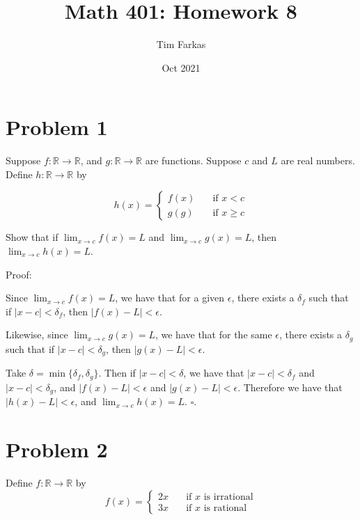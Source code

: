 \documentclass{article}
\title{Math 401: Homework 8}
\author{Tim Farkas}
\date{Oct 2021}
\begin{document}
\maketitle

\section*{Problem 1}

Suppose $f: \mathbb{R} \rightarrow \mathbb{R}$, and $g: \mathbb{R} \rightarrow \mathbb{R}$ are functions. Suppose $c$ and $L$ are real numbers. Define $h: \mathbb{R} \rightarrow \mathbb{R}$ by 

\begin{equation*}
        h(x) = \left\{
                \begin{array}{ll}
                        f(x) & \quad \text{if } x < c \\
                        g(g) & \quad \text{if } x \geq c
                \end{array}	
                \right.
\end{equation*}

Show that if $\lim_{x \rightarrow c} f(x) = L$ and $\lim_{x \rightarrow c} g(x) = L$, then $\lim_{x \rightarrow c} h(x) = L$. 

Proof: 

Since $\lim_{x \rightarrow c} f(x) = L$, we have that for a given $\epsilon$, there exists a $\delta_f$ such that if $\left|x - c\right| < \delta_f$, then $\left|f(x) - L\right| < \epsilon$.

Likewise, since $\lim_{x \rightarrow c} g(x) = L$, we have that for the same $\epsilon$, there exists a $\delta_g$ such that if $\left|x - c\right| < \delta_g$, then $\left|g(x) - L\right| < \epsilon$.

Take $\delta = \min\{\delta_f, \delta_g\}$. Then if $\left|x - c\right| < \delta$, we have that $\left|x - c\right| < \delta_f$ and $\left|x-c\right| < \delta_g$, and $\left|f(x) - L\right| < \epsilon$ and $\left|g(x) - L\right| < \epsilon$.
Therefore we have that $\left|h(x) - L\right| < \epsilon$, and $\lim_{x \rightarrow c} h(x) = L$. $\square$.  

\section*{Problem 2}

Define $f: \mathbb{R} \rightarrow \mathbb{R}$ by 
\begin{equation*}
        f(x) = \left\{
\begin{array}{ll}
        2x & \quad \text{if $x$ is irrational} \\
        3x & \quad \text{if $x$ is rational}
\end{array}\right.
\end{equation*}
\end{document}

